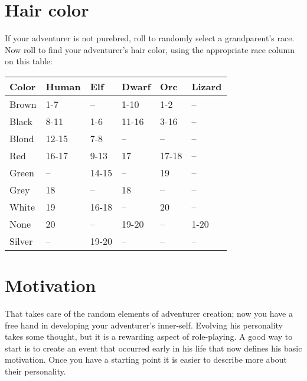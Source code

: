 \begin{multicols*}{2}
\section{Hair color}

If your adventurer is not purebred, roll  to randomly select a grandparent's race. Now roll  to find your adventurer's hair color, using the appropriate race column on this table:
\begin{normboxc}
\small
\begin{tabular}{@{}l l l l l l}
\textbf{Color} & \textbf{Human} & \textbf{Elf} & \textbf{Dwarf} & \textbf{Orc} & \textbf{Lizard}\\
\midrule

Brown & 1-7 & -- & 1-10 & 1-2 & --\\
Black & 8-11 & 1-6 & 11-16 & 3-16 & --\\
Blond & 12-15 & 7-8 & -- & -- & --\\
Red & 16-17 & 9-13 & 17 & 17-18 & --\\
Green & -- & 14-15 & -- & 19 & --\\
Grey & 18 & -- & 18 & -- & --\\
White & 19 & 16-18 & -- & 20 & --\\
None & 20 & -- & 19-20 & -- & 1-20\\
Silver & -- & 19-20 & -- & -- & --
\end{tabular}
\end{normboxc}
\section{Motivation}
That takes care of the random elements of adventurer creation; now you have a free hand in developing your adventurer's inner-self. Evolving his personality takes some thought, but it is a rewarding aspect of role-playing. A good way to start is to create an event that occurred early in his life that now defines his basic motivation. Once you have a starting point it is easier to describe more about their personality.


\end{multicols*}
